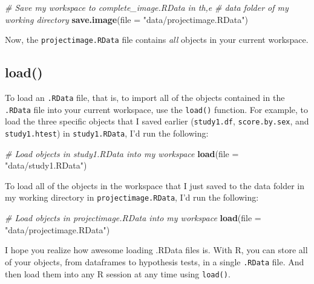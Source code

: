 \documentclass[]{book}
\newenvironment{Shaded}{\begin{snugshade}}{\end{snugshade}}
\newcommand{\KeywordTok}[1]{\textcolor[rgb]{0.13,0.29,0.53}{\textbf{{#1}}}}
\newcommand{\DataTypeTok}[1]{\textcolor[rgb]{0.13,0.29,0.53}{{#1}}}
\newcommand{\StringTok}[1]{\textcolor[rgb]{0.31,0.60,0.02}{{#1}}}
\newcommand{\CommentTok}[1]{\textcolor[rgb]{0.56,0.35,0.01}{\textit{{#1}}}}
\newcommand{\NormalTok}[1]{{#1}}
\theoremstyle{definition}
\theoremstyle{definition}
\theoremstyle{remark}
\begin{document}
\begin{Shaded}
\begin{Highlighting}[]
\CommentTok{# Save my workspace to complete_image.RData in th,e}
\CommentTok{#  data folder of my working directory}
\KeywordTok{save.image}\NormalTok{(}\DataTypeTok{file =} \StringTok{"data/projectimage.RData"}\NormalTok{)}
\end{Highlighting}
\end{Shaded}

Now, the \texttt{projectimage.RData} file contains \emph{all} objects in
your current workspace.

\subsection{load()}\label{load}

To load an \texttt{.RData} file, that is, to import all of the objects
contained in the \texttt{.RData} file into your current workspace, use
the \texttt{load()} function. For example, to load the three specific
objects that I saved earlier (\texttt{study1.df}, \texttt{score.by.sex},
and \texttt{study1.htest}) in \texttt{study1.RData}, I'd run the
following:

\begin{Shaded}
\begin{Highlighting}[]
\CommentTok{# Load objects in study1.RData into my workspace}
\KeywordTok{load}\NormalTok{(}\DataTypeTok{file =} \StringTok{"data/study1.RData"}\NormalTok{)}
\end{Highlighting}
\end{Shaded}

To load all of the objects in the workspace that I just saved to the
data folder in my working directory in \texttt{projectimage.RData}, I'd
run the following:

\begin{Shaded}
\begin{Highlighting}[]
\CommentTok{# Load objects in projectimage.RData into my workspace}
\KeywordTok{load}\NormalTok{(}\DataTypeTok{file =} \StringTok{"data/projectimage.RData"}\NormalTok{)}
\end{Highlighting}
\end{Shaded}

I hope you realize how awesome loading .RData files is. With R, you can
store all of your objects, from dataframes to hypothesis tests, in a
single \texttt{.RData} file. And then load them into any R session at
any time using \texttt{load()}.
\end{document}
